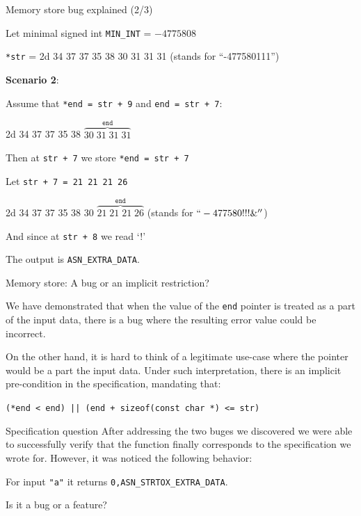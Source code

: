 \documentclass[10pt,usenames,dvipsnames,landscape]{beamer}
\begin{document}
  \begin{frame}{Memory store bug explained (2/3)}

    Let minimal signed int \texttt{MIN\_INT} = $-4775808$ 

    \texttt{*str} = {\color{red}2d 34 37 37 35 38 30 31 31 31} (stands for ``-477580111'') 

    {\bf Scenario 2}:

    Assume that \texttt{*end = str + 9} and \texttt{end = str + 7}:
    
    {\color{red}2d 34 37 37 35 38 {\color{blue} $\overbrace{30 \; 31 \; 31 \; 31}^{\texttt{end}}$}}
    

    Then at \texttt{str + 7} we store \texttt{*end = str + 7}

     Let \texttt{str + 7 = 21 21 21 26} 

   
    {\color{red}2d 34 37 37 35 38 30 {\color{blue}$\overbrace{21 \; 21 \; 21 \; 26}^{\texttt{end}}$}}
    (stands for $``-477580!!!\&''$)

    And since at \texttt{str + 8} we read `!' 

    The output is \color{red}\texttt{ASN\_EXTRA\_DATA}.
    
    \end{frame}

\begin{frame}{Memory store: A bug or an implicit restriction?}

We have demonstrated that when the value of the \texttt{end} pointer is treated as a part of the input data, there is a bug where the resulting error value could be incorrect.

On the other hand, it is hard to think of a legitimate use-case where the pointer would be a part the input data. Under such interpretation, there is an implicit pre-condition in the specification, mandating that:

{\small
\texttt{(*end < end) || (end + sizeof(const char *) <= str)}}

\end{frame}

\begin{frame}{Specification question}
After addressing the two buges we discovered we were able to successfully verify that the function finally corresponds to the specification we wrote for. However, it was noticed the following behavior:

For input \texttt{"a"} it returns {\color{green}\texttt{0,ASN\_STRTOX\_EXTRA\_DATA}}.

Is it a bug or a feature?

\end{frame}
\end{document}
